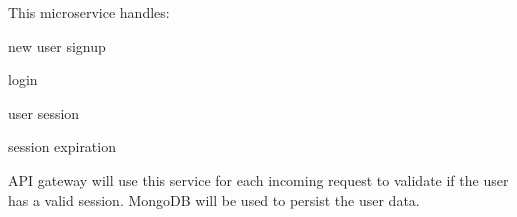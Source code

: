 This microservice handles\+:
\begin{DoxyEnumerate}
\item new user signup
\item login
\item user session
\item session expiration
\end{DoxyEnumerate}

A\+PI gateway will use this service for each incoming request to validate if the user has a valid session. Mongo\+DB will be used to persist the user data. 